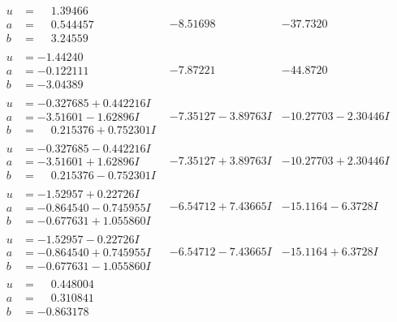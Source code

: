 \documentclass[1p]{elsarticle_modified}
\theoremstyle{definition}
\begin{document}
$$\begin{array}{c|c|c}
\begin{aligned}
u &= \phantom{-}1.39466\phantom{ +0.000000I} \\
a &= \phantom{-}0.544457\phantom{ +0.000000I} \\
b &= \phantom{-}3.24559\phantom{ +0.000000I}\end{aligned}
 & -8.51698\phantom{ +0.000000I} & -37.7320\phantom{ +0.000000I} \\ \hline\begin{aligned}
u &= -1.44240\phantom{ +0.000000I} \\
a &= -0.122111\phantom{ +0.000000I} \\
b &= -3.04389\phantom{ +0.000000I}\end{aligned}
 & -7.87221\phantom{ +0.000000I} & -44.8720\phantom{ +0.000000I} \\ \hline\begin{aligned}
u &= -0.327685 + 0.442216 I \\
a &= -3.51601 - 1.62896 I \\
b &= \phantom{-}0.215376 + 0.752301 I\end{aligned}
 & -7.35127 - 3.89763 I & -10.27703 - 2.30446 I \\ \hline\begin{aligned}
u &= -0.327685 - 0.442216 I \\
a &= -3.51601 + 1.62896 I \\
b &= \phantom{-}0.215376 - 0.752301 I\end{aligned}
 & -7.35127 + 3.89763 I & -10.27703 + 2.30446 I \\ \hline\begin{aligned}
u &= -1.52957 + 0.22726 I \\
a &= -0.864540 - 0.745955 I \\
b &= -0.677631 + 1.055860 I\end{aligned}
 & -6.54712 + 7.43665 I & -15.1164 - 6.3728 I \\ \hline\begin{aligned}
u &= -1.52957 - 0.22726 I \\
a &= -0.864540 + 0.745955 I \\
b &= -0.677631 - 1.055860 I\end{aligned}
 & -6.54712 - 7.43665 I & -15.1164 + 6.3728 I \\ \hline\begin{aligned}
u &= \phantom{-}0.448004\phantom{ +0.000000I} \\
a &= \phantom{-}0.310841\phantom{ +0.000000I} \\
b &= -0.863178\phantom{ +0.000000I}\end{aligned}

\end{array}$$
\end{document}
